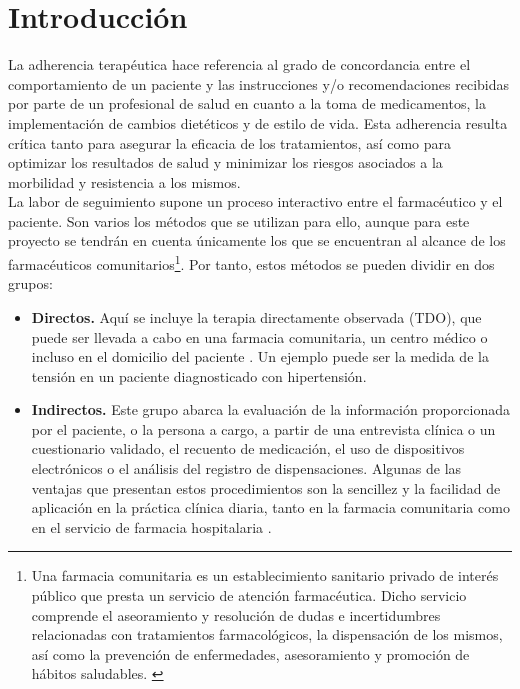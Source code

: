 \chapter{Introducción}

La adherencia terapéutica hace referencia al grado de concordancia entre el comportamiento de un paciente y las instrucciones y/o recomendaciones recibidas por parte de un profesional de salud en cuanto a la toma de medicamentos, la implementación de cambios dietéticos y de estilo de vida. Esta adherencia resulta crítica tanto para asegurar la eficacia de los tratamientos, así como para optimizar los resultados de salud y minimizar los riesgos asociados a la morbilidad y resistencia a los mismos. \\

La labor de seguimiento supone un proceso interactivo entre el farmacéutico y el paciente. Son varios los métodos que se utilizan para ello, aunque para este proyecto se tendrán en cuenta únicamente los que se encuentran al alcance de los farmacéuticos comunitarios\footnote{Una farmacia comunitaria es un establecimiento sanitario privado de interés público que presta un servicio de atención farmacéutica. Dicho servicio comprende el aseoramiento y resolución de dudas e incertidumbres relacionadas con tratamientos farmacológicos, la dispensación de los mismos, así como la prevención de enfermedades, asesoramiento y promoción de hábitos saludables. \label{farmaciaComunitaria}}. Por tanto, estos métodos se pueden dividir en dos grupos:
\begin{itemize}
	\item \textbf{Directos.} Aquí se incluye la terapia directamente observada (TDO), que puede ser llevada a cabo en una farmacia comunitaria, un centro médico o incluso en el domicilio del paciente \cite{pages2018metodos}. Un ejemplo puede ser la medida de la tensión en un paciente diagnosticado con hipertensión.
	
	\item \textbf{Indirectos.} Este grupo abarca la evaluación de la información proporcionada por el paciente, o la persona a cargo, a partir de una entrevista clínica o un cuestionario validado, el recuento de medicación, el uso de dispositivos electrónicos o el análisis del registro de dispensaciones. Algunas de las ventajas que presentan estos procedimientos son la sencillez y la facilidad de aplicación en la práctica clínica diaria, tanto en la farmacia comunitaria como en el servicio de farmacia hospitalaria \cite{pages2018metodos}.
\end{itemize} 

